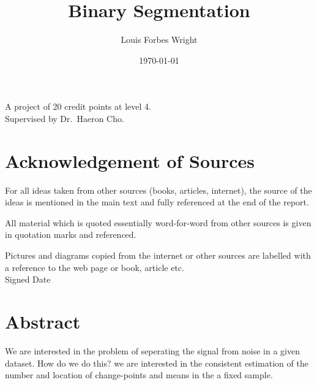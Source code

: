 \documentclass[a4paper, 12pt, notitlepage]{report}
\title{Binary Segmentation}
\author{Louis Forbes Wright}
\date{\today}
\begin{document}
\maketitle





%


\begin{center}
A project of 20 credit points at level 4. %
\\[12pt]
Supervised by Dr.\ Haeron Cho. 
\end{center}
\thispagestyle{empty}
\newpage
\section*{Acknowledgement of Sources} %
For all ideas taken from other sources (books, articles, internet), the source of the ideas is mentioned in the main text and fully referenced at the end of the report.

All material which is quoted essentially word-for-word from other sources is given in quotation marks and referenced.

Pictures and diagrams copied from the internet or other sources are labelled with a reference to the web page or book, article etc.
\\[12pt]
Signed \dotfill Date \dotfill

\newpage
\section*{Abstract}
We are interested in the problem of seperating the signal from noise in a given dataset. How do we do this?
we are interested in the consistent estimation of the number and location of change-points and means in the a fixed sample.
\end{document}
